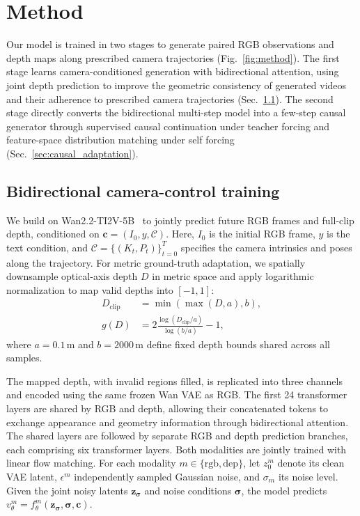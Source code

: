 \section{Method}
\label{sec:method}

Our model is trained in two stages to generate paired RGB observations and depth maps along prescribed camera trajectories (Fig.~\ref{fig:method}).
The first stage learns camera-conditioned generation with bidirectional attention, using joint depth prediction to improve the geometric consistency of generated videos and their adherence to prescribed camera trajectories (Sec.~\ref{sec:bidirectional_training}).
The second stage directly converts the bidirectional multi-step model into a few-step causal generator through supervised causal continuation under teacher forcing and feature-space distribution matching under self forcing (Sec.~\ref{sec:causal_adaptation}).

\subsection{Bidirectional camera-control training}
\label{sec:bidirectional_training}
\label{sec:joint_generation}


We build on Wan2.2-TI2V-5B~\cite{wan2025wanopenadvancedlargescale} to jointly predict future RGB frames and full-clip depth, conditioned on $\mathbf c=(I_0,y,\mathcal{C})$.
%
Here, $I_0$ is the initial RGB frame, $y$ is the text condition, and $\mathcal{C}=\{(K_t,P_t)\}_{t=0}^{T}$ specifies the camera intrinsics and poses along the trajectory.
%
For metric ground-truth adaptation, we spatially downsample optical-axis depth $D$ in metric space and apply logarithmic normalization to map valid depths into $[-1,1]$:
\begin{equation}
\begin{aligned}
D_{\mathrm{clip}} &= \min(\max(D,a),b),\\
g(D) &= 2\frac{\log(D_{\mathrm{clip}}/a)}{\log(b/a)}-1,
\end{aligned}
\label{eq:metric_depth_encoding}
\end{equation}
where $a=0.1$\,m and $b=2000$\,m define fixed depth bounds shared across all samples.

%
The mapped depth, with invalid regions filled, is replicated into three channels and encoded using the same frozen Wan VAE as RGB.
%
The first 24 transformer layers are shared by RGB and depth, allowing their concatenated tokens to exchange appearance and geometry information through bidirectional attention.
%
The shared layers are followed by separate RGB and depth prediction branches, each comprising six transformer layers.
%
Both modalities are jointly trained with linear flow matching.
%
For each modality $m\in\{\mathrm{rgb},\mathrm{dep}\}$, let $z_0^m$ denote its clean VAE latent, $\epsilon^m$ independently sampled Gaussian noise, and $\sigma_m$ its noise level.
%
Given the joint noisy latents $\mathbf z_{\boldsymbol\sigma}$ and noise conditions $\boldsymbol\sigma$, the model predicts $v_\theta^m=f_\theta^m(\mathbf z_{\boldsymbol\sigma},\boldsymbol\sigma,\mathbf c)$.
%

